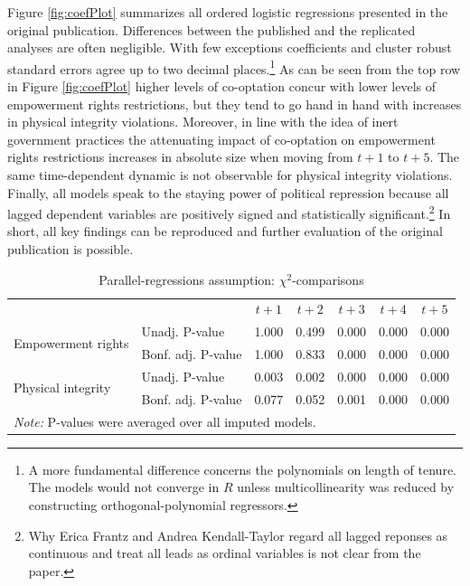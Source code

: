 Figure \ref{fig:coefPlot} summarizes all ordered logistic
regressions presented in the original publication. 
Differences between the published and the replicated 
analyses are often negligible. With few exceptions 
coefficients and cluster robust standard errors 
agree up to two decimal places.\footnote{A more fundamental
difference concerns the polynomials on length of tenure. The 
models would not converge in $R$ unless multicollinearity 
was reduced by constructing orthogonal-polynomial 
regressors.} As can be seen from the top row in 
Figure \ref{fig:coefPlot} higher levels of co-optation 
concur with lower levels of empowerment rights 
restrictions, but they tend to go hand in hand with 
increases in physical integrity violations. Moreover, in 
line with the idea of inert government practices the 
attenuating impact of co-optation on empowerment rights 
restrictions increases in absolute size when moving from
$t+1$ to $t+5$. The same time-dependent dynamic is not 
observable for physical integrity violations. Finally, all 
models speak to the staying power of political repression 
because all lagged dependent variables are positively 
signed and statistically significant.\footnote{Why 
Erica Frantz and Andrea Kendall-Taylor regard all lagged 
reponses as continuous and treat all leads as ordinal 
variables is not clear from the paper.} In short, all
key findings can be reproduced and further evaluation of the
original publication is possible.

\begin{table}[!htb]
\centering
\caption{Parallel-regressions assumption: $\chi^2$-comparisons}
\label{tbl:Chi2comparisons}
  \begin{tabular}{ll*{5}{c}} \toprule
    ~ & ~ & $t+1$ & $t+2$ & $t+3$ & $t+4$ & $t+5$ \\ \cmidrule{2-7}
    \multirow{2}{*}{Empowerment rights} & Unadj. P-value & 1.000 & 0.499 & 0.000 & 0.000 & 0.000 \\
    ~ & Bonf. adj. P-value & 1.000 & 0.833 & 0.000 & 0.000 & 0.000 \\
    \multirow{2}{*}{Physical integrity} & Unadj. P-value & 0.003 & 0.002 & 0.000 & 0.000 & 0.000 \\
    ~ & Bonf. adj. P-value & 0.077 & 0.052 & 0.001 & 0.000 & 0.000 \\ 
    \bottomrule
    \multicolumn{7}{l}{\textit{Note:} P-values were averaged over all imputed models.} \\
  \end{tabular}
\end{table}

